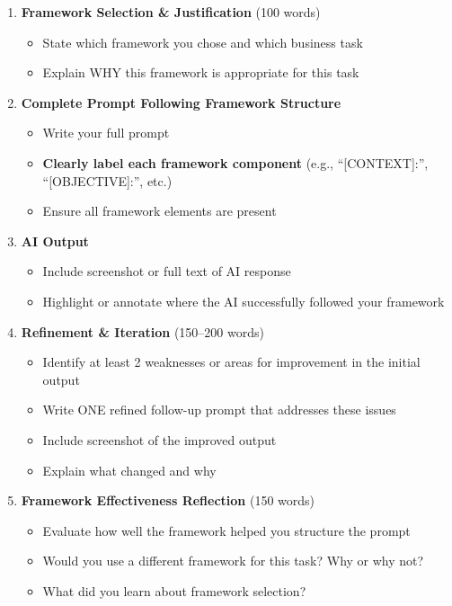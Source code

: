 \documentclass[11pt]{article}
\begin{document}
\begin{enumerate}[label=\alph*.]
    \item \textbf{Framework Selection \& Justification} (100 words)
    \begin{itemize}
        \item State which framework you chose and which business task
        \item Explain WHY this framework is appropriate for this task
    \end{itemize}
    
    \item \textbf{Complete Prompt Following Framework Structure}
    \begin{itemize}
        \item Write your full prompt
        \item \textbf{Clearly label each framework component} (e.g., ``[CONTEXT]:'', ``[OBJECTIVE]:'', etc.)
        \item Ensure all framework elements are present
    \end{itemize}
    
    \item \textbf{AI Output}
    \begin{itemize}
        \item Include screenshot or full text of AI response
        \item Highlight or annotate where the AI successfully followed your framework
    \end{itemize}
    
    \item \textbf{Refinement \& Iteration} (150--200 words)
    \begin{itemize}
        \item Identify at least 2 weaknesses or areas for improvement in the initial output
        \item Write ONE refined follow-up prompt that addresses these issues
        \item Include screenshot of the improved output
        \item Explain what changed and why
    \end{itemize}
    
    \item \textbf{Framework Effectiveness Reflection} (150 words)
    \begin{itemize}
        \item Evaluate how well the framework helped you structure the prompt
        \item Would you use a different framework for this task? Why or why not?
        \item What did you learn about framework selection?
    \end{itemize}
\end{enumerate}
\end{document}
